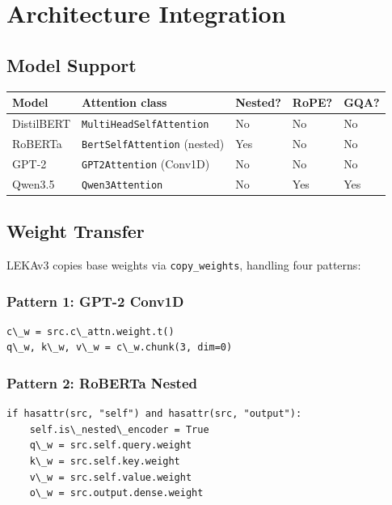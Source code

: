 \section{Architecture Integration}

\subsection{Model Support}

\begin{table}[H]
\centering
\small
\begin{tabular}{lllll}
\toprule
\textbf{Model} & \textbf{Attention class} & \textbf{Nested?} & \textbf{RoPE?} & \textbf{GQA?} \\
\midrule
DistilBERT & \texttt{MultiHeadSelfAttention} & No & No & No \\
RoBERTa & \texttt{BertSelfAttention} (nested) & Yes & No & No \\
GPT-2 & \texttt{GPT2Attention} (Conv1D) & No & No & No \\
Qwen3.5 & \texttt{Qwen3Attention} & No & Yes & Yes \\
\bottomrule
\end{tabular}
\end{table}

\subsection{Weight Transfer}

LEKAv3 copies base weights via \texttt{copy\_weights}, handling four patterns:

\subsubsection{Pattern 1: GPT-2 Conv1D}

\begin{lstlisting}
c\_w = src.c\_attn.weight.t()
q\_w, k\_w, v\_w = c\_w.chunk(3, dim=0)
\end{lstlisting}

\subsubsection{Pattern 2: RoBERTa Nested}

\begin{lstlisting}
if hasattr(src, "self") and hasattr(src, "output"):
    self.is\_nested\_encoder = True
    q\_w = src.self.query.weight
    k\_w = src.self.key.weight
    v\_w = src.self.value.weight
    o\_w = src.output.dense.weight
\end{lstlisting}

